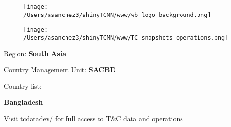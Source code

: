 \documentclass{article}\usepackage[]{graphicx}\usepackage[]{color}
\begin{document}
\begin{figure}
  \vspace{-3ex} %
  \hspace{-7ex} %
  \texttt{[image: /Users/asanchez3/shinyTCMN/www/wb\_logo\_background.png]}
\end{figure}
\begin{figure}
  \begin{minipage}[t]{0.99\textwidth} %
      \vspace{-30ex}
      \hspace{-2ex}
      \raggedright{\texttt{[image: /Users/asanchez3/shinyTCMN/www/TC\_snapshots\_operations.png]}}
  \end{minipage}
\end{figure}

\vspace{2ex}
\raggedright{\Large Region: \color{white!30!blue} \textbf{\Large South Asia}}

\vspace{2ex}
\raggedright{\Large Country Management Unit: \color{white!30!blue} \textbf{SACBD}}

\vspace{2ex}
\raggedright{\Large Country list:}  

\vspace{2ex}

\raggedright{\textbf{\Large \color{white!30!blue}Bangladesh\\
 }}

\vspace{10ex}
\raggedright{\large Visit \href{http://tcdatadev/}{\Large tcdatadev/} for full access to T\&C data and operations}

%
\end{document}
